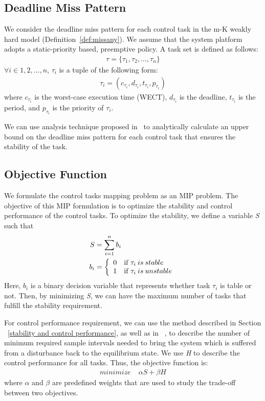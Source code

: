 \subsection{Deadline Miss Pattern}
We consider the deadline miss pattern for each control task in the m-K weakly hard model (Definition~\ref{def:missany}). We assume that the system platform adopts a static-priority based, preemptive policy. A task set is defined as follows:
\begin{align*}
\tau = \{\tau_1, \tau_2, ..., \tau_n\}
\end{align*}
$\forall i \in {1, 2, ..., n}$, $\tau_i$ is a tuple of the following form:
\begin{align*}
\tau_i  = (c_{\tau_i}, d_{\tau_i}, t_{\tau_i}, p_{\tau_i})
\end{align*}
where $c_{\tau_i}$ is the worst-case execution time (WECT), $d_{\tau_i}$ is the deadline, $t_{\tau_i}$ is the period, and $p_{\tau_i}$ is the priority of $\tau_i$. 

We can use analysis technique proposed in~\cite{liang2019security, goswami2014relax} to analytically calculate an upper bound on the deadline miss pattern for each control task that ensures the stability of the task. 

\subsection{Objective Function}
We formulate the control tasks mapping problem as an MIP problem. The objective of this MIP formulation is to optimize the stability and control performance of the control tasks. To optimize the stability, we define a variable \textit{S} such that 
\begin{align*}
S &= \sum_{i=1}^n b_i \\
b_i &= \left\{ \begin{array}{ll} 0 & \mbox{if } \tau_i \: is \: stable \\ 1 & \mbox{if } \tau_i \: is \: unstable \end{array} \right.
\end{align*}
Here, \textit{$b_i$} is a binary decision variable that represents whether task $\tau_i$ is table or not. Then, by minimizing \textit{S}, we can have the maximum number of tasks that fulfill the stability requirement.

For control performance requirement, we can use the method described in Section ~\ref{stability and control performance}, as well as in ~\cite{liang2019security}, to describe the number of minimum required sample intervals needed to bring the system which is suffered from a disturbance back to the equilibrium state. We use \textit{H} to describe the control performance for all tasks. Thus, the objective function is:
\begin{align*}
minimize \;&\alpha\textit{S} + \beta\textit{H}
\end{align*}
where $\alpha$ and $\beta$ are predefined weights that are used to study the trade-off between two objectives.


